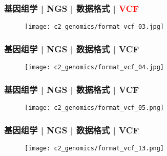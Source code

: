 \begin{frame}
  \frametitle{基因组学 | NGS | 数据格式 | \textcolor{red}{VCF}}
  \begin{figure}
    \centering
    \texttt{[image: c2\_genomics/format\_vcf\_03.jpg]}
  \end{figure}
\end{frame}

\begin{frame}
  \frametitle{基因组学 | NGS | 数据格式 | VCF}
  \begin{figure}
    \centering
    \texttt{[image: c2\_genomics/format\_vcf\_04.jpg]}
  \end{figure}
\end{frame}
    
\begin{frame}
  \frametitle{基因组学 | NGS | 数据格式 | VCF}
  \begin{figure}
    \centering
    \texttt{[image: c2\_genomics/format\_vcf\_05.png]}
  \end{figure}
\end{frame}
    
\begin{frame}
  \frametitle{基因组学 | NGS | 数据格式 | VCF}
  \begin{figure}
    \centering
    \texttt{[image: c2\_genomics/format\_vcf\_13.png]}
  \end{figure}
\end{frame}
    
